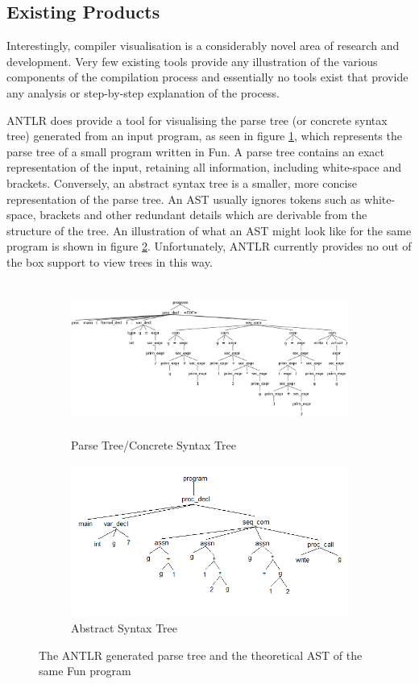 \documentclass{l4proj}
\begin{document}
\subsection{Existing Products}
Interestingly, compiler visualisation is a considerably novel area of research and development. Very few existing tools provide any illustration of the various components of the compilation process and essentially no tools exist that provide any analysis or step-by-step explanation of the process.

ANTLR does provide a tool for visualising the parse tree (or concrete syntax tree) generated from an input program, as seen in figure \ref{fig:ANTLR-parse-tree}, which represents  the parse tree of a small program written in Fun. A parse tree contains an exact representation of the input, retaining all information, including white-space and brackets. Conversely, an abstract syntax tree is a smaller, more concise representation of the parse tree. An AST usually ignores tokens such as white-space, brackets and other redundant details which are derivable from the structure of the tree. An illustration of what an AST might look like for the same program is shown in figure \ref{fig:ANTLR-syntax-tree}. Unfortunately, ANTLR currently provides no out of the box support to view trees in this way.

\begin{figure}[h]
	\begin{subfigure}[b]{0.5\textwidth}
		\includegraphics[height=5cm,width=\linewidth]{images/2-2a.png}
		\caption{Parse Tree/Concrete Syntax Tree}
		\label{fig:ANTLR-parse-tree}
	\end{subfigure}
	\begin{subfigure}[b]{0.5\textwidth}
		\includegraphics[height=5cm,width=\linewidth]{images/2-2b.png}
		\caption{Abstract Syntax Tree}
		\label{fig:ANTLR-syntax-tree}
	\end{subfigure}
	\caption{The ANTLR generated parse tree and the theoretical AST of the same Fun program}\label{fig:parse-abstract-tree}	
\end{figure}
\end{document}
